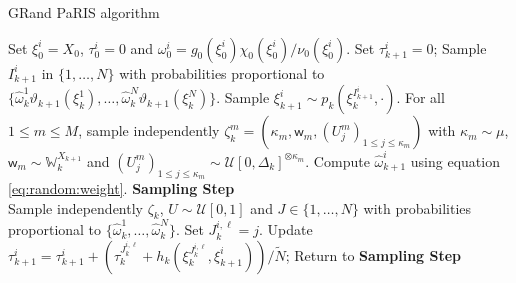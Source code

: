 \documentclass[12pt,draft]{article}
\newcommand{\eqsp}{\;}
\newcommand{\1}{\mathrm{1}}
\newcommand{\qk}{q_{k}}
\newcommand{\mw}{\mathsf{w}}%
\begin{document}
\begin{algorithm}
\caption{GRand PaRIS algorithm}
\begin{algorithmic}
\STATE Set $\xi_0^i = X_0$, $\tau_0^i = 0$  and  $\omega_0^i = g_0(\xi_0^i)\chi_0(\xi_0^i)/\nu_0(\xi_0^i)$.
\ENDFOR
{}
\STATE Set $\tau_{k+1}^i=0$;
\STATE Sample $I_{k+1}^{i}$ in $\{1,\ldots,N\}$ with probabilities proportional to $\{\widehat{\omega}_{k}^1\vartheta_{k+1}(\xi_{k}^1),\dots,\widehat{\omega}_{k}^N\vartheta_{k+1}(\xi_{k}^N)\}$.
\STATE Sample $\xi_{k+1}^{i} \sim p_k(\xi_{k}^{I_{k+1}^{i}},\cdot)$.
\STATE For all $1\le m\le M$, sample independently $\zeta_k^m=(\kappa_m,\mw_m, (U_j^m)_{1\leq j\leq \kappa_m})$ with $\kappa_m\sim \mu$, $\mw_m\sim \mathbb{W}_k^{X_{k+1}}$ and $(U_j^m)_{1\leq j\leq \kappa_m}\sim \mathcal{U}[0,\Delta_k]^{\otimes \kappa_m}$.
\STATE Compute $\widehat{\omega}^{i}_{k+1}$ using equation \eqref{eq:random:weight}.
\STATE \textbf{\sc Sampling Step} \\
Sample independently $\zeta_k$, $U\sim \mathcal{U}[0,1]$ and $J\in\{1,\ldots,N\}$ with probabilities proportional to  $\{\widehat{\omega}_{k}^1,\dots,\widehat{\omega}_{k}^N\}$.
\IF{ $$U \leq \frac{\widehat{\qk}(\xi_{k}^J,\xi_{k+1}^i,\zeta_k)}{\hat{\sigma}^k_+},$$}
\STATE Set $J_k^{i,\ell} = j$.
\STATE Update $\tau_{k+1}^i = \tau_{k+1}^i + \left(\tau^{J_k^{i,\ell}}_{k} + h_k(\xi^{J_k^{i,\ell}}_{k},\xi^i_{k+1})\right)/\tilde{N}$;
\ELSE 
\STATE Return to \textbf{\sc Sampling Step}
\ENDIF
\ENDFOR
\ENDFOR
\ENDFOR
\end{algorithmic}
\label{alg:Ozaki:PaRIS}
\end{algorithm}
\end{document}
